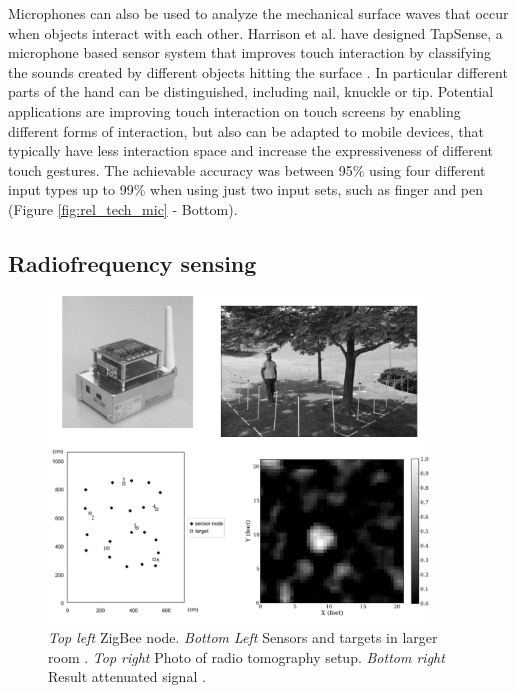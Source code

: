 Microphones can also be used to analyze the mechanical surface waves that occur when objects interact with each other. Harrison et al. have designed TapSense, a microphone based sensor system that improves touch interaction by classifying the sounds created by different objects hitting the surface \cite{harrison2011tapsense}. In particular different parts of the hand can be distinguished, including nail, knuckle or tip. Potential applications are improving touch interaction on touch screens by enabling different forms of interaction, but also can be adapted to mobile devices, that typically have less interaction space and increase the expressiveness of different touch gestures. The achievable accuracy was between 95\% using four different input types up to 99\% when using just two input sets, such as finger and pen (Figure \ref{fig:rel_tech_mic} - Bottom).

\subsection{Radiofrequency sensing}
\begin{figure}[h]
\centering
\includegraphics[width=0.9\textwidth]{images/tech_mic1}
\caption{\emph{Top left} ZigBee node. \emph{Bottom Left} Sensors and targets in larger room \cite{sugano2006indoor}. \emph{Top right} Photo of radio tomography setup. \emph{Bottom right} Result attenuated signal \cite{wilson2010radio}.}
\label{fig:tech_mic1}
\end{figure}


